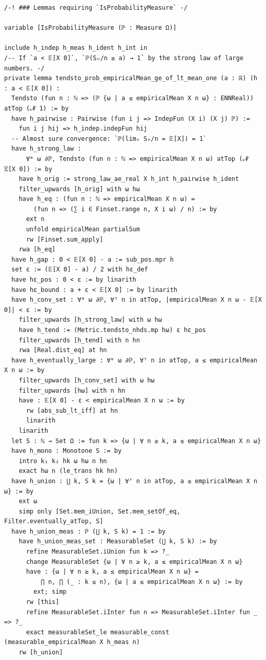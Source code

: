 \begin{lstlisting}
/-! ### Lemmas requiring `IsProbabilityMeasure` -/

variable [IsProbabilityMeasure (ℙ : Measure Ω)]

include h_indep h_meas h_ident h_int in
/-- If `a < 𝔼[X 0]`, `ℙ(Sₙ/n ≥ a) → 1` by the strong law of large numbers. -/
private lemma tendsto_prob_empiricalMean_ge_of_lt_mean_one (a : ℝ) (h : a < 𝔼[X 0]) :
  Tendsto (fun n : ℕ => (ℙ {ω | a ≤ empiricalMean X n ω} : ENNReal)) atTop (𝓝 1) := by
  have h_pairwise : Pairwise (fun i j => IndepFun (X i) (X j) ℙ) :=
    fun i j hij => h_indep.indepFun hij
  -- Almost sure convergence: `ℙ(limₙ Sₙ/n = 𝔼[X]) = 1`
  have h_strong_law :
      ∀ᵐ ω ∂ℙ, Tendsto (fun n : ℕ => empiricalMean X n ω) atTop (𝓝 𝔼[X 0]) := by
    have h_orig := strong_law_ae_real X h_int h_pairwise h_ident
    filter_upwards [h_orig] with ω hω
    have h_eq : (fun n : ℕ => empiricalMean X n ω) =
        (fun n => (∑ i ∈ Finset.range n, X i ω) / n) := by
      ext n
      unfold empiricalMean partialSum
      rw [Finset.sum_apply]
    rwa [h_eq]
  have h_gap : 0 < 𝔼[X 0] - a := sub_pos.mpr h
  set ε := (𝔼[X 0] - a) / 2 with hε_def
  have hε_pos : 0 < ε := by linarith
  have hε_bound : a + ε < 𝔼[X 0] := by linarith
  have h_conv_set : ∀ᵐ ω ∂ℙ, ∀ᶠ n in atTop, |empiricalMean X n ω - 𝔼[X 0]| < ε := by
    filter_upwards [h_strong_law] with ω hω
    have h_tend := (Metric.tendsto_nhds.mp hω) ε hε_pos
    filter_upwards [h_tend] with n hn
    rwa [Real.dist_eq] at hn
  have h_eventually_large : ∀ᵐ ω ∂ℙ, ∀ᶠ n in atTop, a ≤ empiricalMean X n ω := by
    filter_upwards [h_conv_set] with ω hω
    filter_upwards [hω] with n hn
    have : 𝔼[X 0] - ε < empiricalMean X n ω := by
      rw [abs_sub_lt_iff] at hn
      linarith
    linarith
  let S : ℕ → Set Ω := fun k => {ω | ∀ n ≥ k, a ≤ empiricalMean X n ω}
  have h_mono : Monotone S := by
    intro k₁ k₂ hk ω hω n hn
    exact hω n (le_trans hk hn)
  have h_union : ⋃ k, S k = {ω | ∀ᶠ n in atTop, a ≤ empiricalMean X n ω} := by
    ext ω
    simp only [Set.mem_iUnion, Set.mem_setOf_eq, Filter.eventually_atTop, S]
  have h_union_meas : ℙ (⋃ k, S k) = 1 := by
    have h_union_meas_set : MeasurableSet (⋃ k, S k) := by
      refine MeasurableSet.iUnion fun k => ?_
      change MeasurableSet {ω | ∀ n ≥ k, a ≤ empiricalMean X n ω}
      have : {ω | ∀ n ≥ k, a ≤ empiricalMean X n ω} =
          ⋂ n, ⋂ (_ : k ≤ n), {ω | a ≤ empiricalMean X n ω} := by
        ext; simp
      rw [this]
      refine MeasurableSet.iInter fun n => MeasurableSet.iInter fun _ => ?_
      exact measurableSet_le measurable_const (measurable_empiricalMean X h_meas n)
    rw [h_union]
\end{lstlisting}
